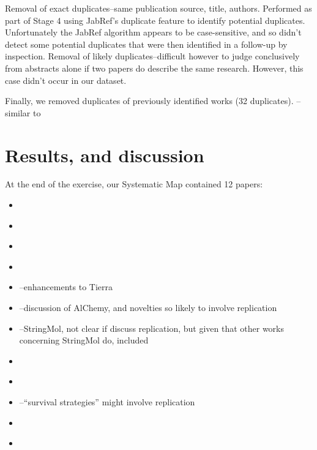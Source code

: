 Removal of exact duplicates--same publication source, title, authors. Performed as part of Stage 4 using JabRef's duplicate feature to identify potential duplicates. Unfortunately the JabRef algorithm appears to be case-sensitive, and so didn't detect some potential duplicates that were then identified in a follow-up by inspection.
Removal of likely duplicates--difficult however to judge conclusively from abstracts alone if two papers do describe the same research. However, this case didn't occur in our dataset.


Finally, we removed duplicates of previously identified works (32 duplicates).
\eg \cite{smFaulconbridgeStepneyMillerEtAl2011}--similar to \cite{Faulconbridge2011, Faulconbridge2010}

\section{Results, and discussion}

At the end of the exercise, our Systematic Map contained 12 papers:

\begin{itemize}
\item \cite{smAdamsLipson2003}
\item \cite{smBobrikKvasnickaPospichal2008a}
\item \cite{smBobrikKvasnickaPospichal2008}
\item \cite{smEllabaan2007}
\item \cite{smSugiuraSuzukiShioseEtAl2003}--enhancements to Tierra
\item \cite{smFenizioMatsumaruDittrich2011}--discussion of AlChemy, and novelties so likely to involve replication
\item \cite{smHickinbothamClarkNellisEtAl2016}--StringMol, not clear if discuss replication, but given that other works concerning StringMol do, included
\item \cite{smHinzeFaslerLenserEtAl2009}
\item \cite{smSuzuki2003a}
\item \cite{smBanzhafDittrichEller1999}--``survival strategies'' might involve replication
\item \cite{smGordon-Smith2011}
\item \cite{smGohEweGoh2014}
\end{itemize}


